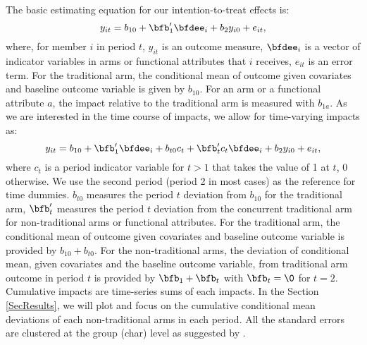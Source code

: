 	The basic estimating equation for our intention-to-treat effects is:
	\begin{equation}
	y_{it}=b_{10}+\bfb'_{1}\bfdee_{i}+b_{2}y_{i0}+e_{it},
	\end{equation}
	where, for member $i$ in period $t$, $y_{it}$ is an outcome measure, $\bfdee_{i}$ is a vector of indicator variables in arms or functional attributes that $i$ receives, $e_{it}$ is an error term. For the \textsf{traditional} arm, the conditional mean of outcome given covariates and baseline outcome variable is given by $b_{10}$. For an arm or a functional attribute $a$, the impact relative to the traditional arm is measured with $b_{1a}$. As we are interested in the time course of impacts, we allow for time-varying impacts as:
	\begin{equation}
	y_{it}=b_{10}+\bfb'_{1}\bfdee_{i}+b_{t0}c_{t}+\bfb'_{t}c_{t}\bfdee_{i}+b_{2}y_{i0}+e_{it},
	\label{EstimatingEqTimeVarying}
	\end{equation}
	where $c_{t}$ is a period indicator variable for $t>1$ that takes the value of 1 at $t$, 0 otherwise. We use the second period (period 2 in most cases) as the reference for time dummies. $b_{t0}$ measures the period $t$ deviation from $b_{10}$ for the \textsf{traditional} arm, $\bfb'_{t}$ measures the period $t$ deviation from the concurrent \textsf{traditional} arm for non-\textsf{traditional} arms or functional attributes. For the \textsf{traditional} arm, the conditional mean of outcome given covariates and baseline outcome variable is provided by $b_{10}+b_{t0}$. For the non-\textsf{traditional} arms, the deviation of conditional mean, given covariates and the baseline outcome variable, from \textsf{traditional} arm outcome in period $t$ is provided by $\bfb_{1}+\bfb_{t}$ with $\bfb_{t}=\0$ for $t=2$. Cumulative impacts are time-series sums of each impacts. In the Section \ref{SecResults}, we will plot and focus on the cumulative conditional mean deviations of each non-\textsf{traditional} arms in each period. All the standard errors are clustered at the group (char) level as suggested by \citet{AbadieAtheyImbensWooldridge2017}.%

